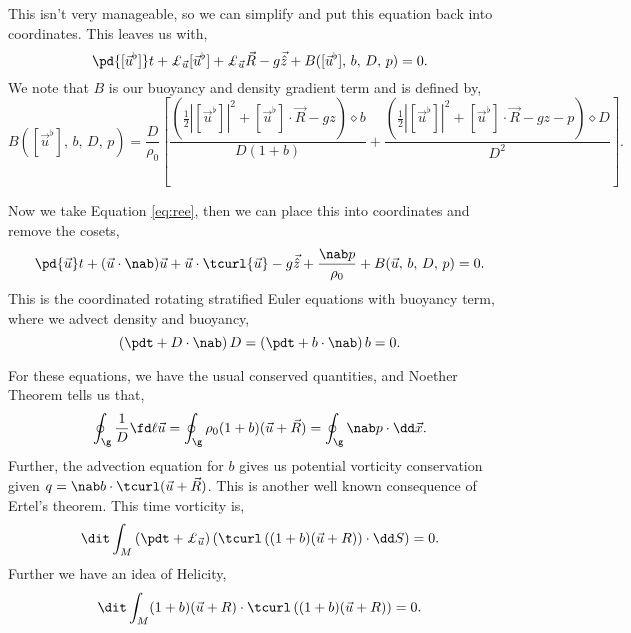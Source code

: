 This isn't very manageable, so we can simplify and put this equation back into coordinates. This leaves us with,
\begin{equation}
  \pd {[\vec u^\flat]} t + \pounds_{\vec u} [\vec u^\flat] + \pounds_{\vec u} \vec R - g\vec {\hat z} + B([\vec u^\flat],\, b,\, D,\, p) = 0.\label{eq:ree}
\end{equation}
We note that $B$ is our buoyancy and density gradient term and is defined by,
$$ B([\vec u^\flat],\, b,\, D,\, p) = \frac{D}{\rho_0}\left[ \frac{\left( \frac{1}{2}|[\vec u^\flat]|^2 + [\vec u^\flat] \cdot \vec R - gz \right)\diamond b}{D(1 + b)} + \frac{\left( \frac{1}{2}|[\vec u^\flat]|^2 + [\vec u^\flat] \cdot \vec R - gz - p \right)\diamond D}{D^2} \right]. $$

\noindent
Now we take Equation \eqref{eq:ree}, then we can place this into coordinates and remove the cosets,
$$ \pd {\vec u} t + ({\vec u} \cdot \nab) {\vec u} + {\vec u} \cdot \tcurl {\vec u} - g\vec{\hat z} + \frac{\nab p}{\rho_0} + B(\vec u,\, b,\, D,\, p) = 0. $$
This is the coordinated rotating stratified Euler equations with buoyancy term, where we advect density and buoyancy,
$$ \left(\pdt + D \cdot\nab\right) D  = \left(\pdt + b \cdot\nab\right) b = 0. $$

\noindent
For these equations, we have the usual conserved quantities, and Noether Theorem tells us that,
$$ \oint_{\g} \frac{1}{D}\fd \ell {\vec u} = \oint_{\g} \rho_0 (1 + b)(\vec u + \vec R)  = \oint_{\g} \nab p \cdot \dd \vec x. $$
Further, the advection equation for $b$ gives us potential vorticity conservation given $q = \nab b \cdot \tcurl(\vec u + \vec R)$. This is another well known consequence of Ertel's theorem. This time vorticity is,
$$ \dit \int_M \left( \pdt + \pounds_{\vec u} \right)\left( \tcurl\left((1 + b)(\vec u + R)\right) \cdot\dd S \right) = 0. $$
Further we have an idea of Helicity,
$$ \dit \int_M (1 + b)(\vec u + R) \cdot \tcurl \left( (1 + b)(\vec u + R) \right) = 0. $$